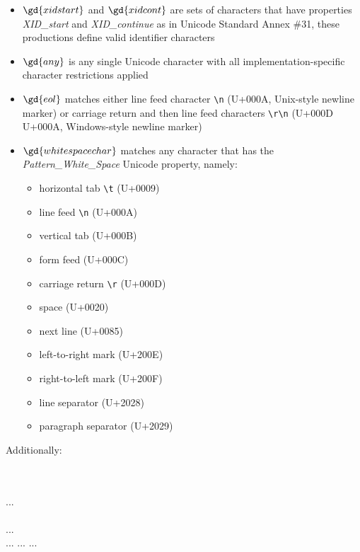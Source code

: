 \begin{bnfutils}
\begin{itemize}
  \item \(\gd{xidstart}\) and \(\gd{xidcont}\) are sets of characters that have properties \emph{XID\_start} and \emph{XID\_continue} as in Unicode Standard Annex \#31\cite{UAX31}, these productions define valid identifier characters
  \item \(\gd{any}\) is any single Unicode character with all implementation-specific character restrictions applied
  \item \(\gd{eol}\) matches either line feed character \texttt{\textbackslash n} (U+000A, Unix-style newline marker) or carriage return and then line feed characters \texttt{\textbackslash r\textbackslash n} (U+000D U+000A, Windows-style newline marker)
  \item \(\gd{whitespacechar}\) matches any character that has the \emph{Pattern\_White\_Space} Unicode property, namely:

    \begin{itemize}
      \item horizontal tab \texttt{\textbackslash t} (U+0009)
      \item line feed \texttt{\textbackslash n} (U+000A)
      \item vertical tab (U+000B)
      \item form feed (U+000C)
      \item carriage return \texttt{\textbackslash r} (U+000D)
      \item space (U+0020)
      \item next line (U+0085)
      \item left-to-right mark (U+200E)
      \item right-to-left mark (U+200F)
      \item line separator (U+2028)
      \item paragraph separator (U+2029)
    \end{itemize}
\end{itemize}
\end{bnfutils}

Additionally:

\begin{bnf}
   \eq {} \\
  \\
   \eq {} \gor {} \gor ... \gor {} \\
   \eq {} \gor {} \\
   \eq {} \gor {} \gor ... \gor {} \\
   \eq  {} \gor {} \gor ... \gor {}
              \gor {} \gor {} \gor ... \gor {}
              \gor {} \gor {} \gor ... \gor {}
\end{bnf}

